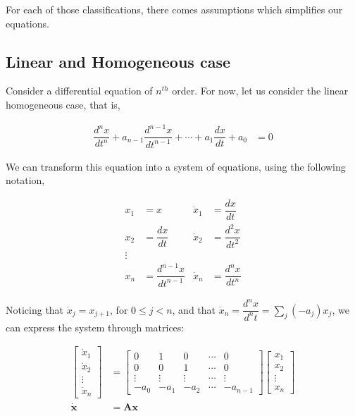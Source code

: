 \documentclass[12pt]{article}
\begin{document}
		For each of those classifications, there comes assumptions which simplifies our equations.
	
	\subsection{Linear and Homogeneous case}
	Consider a differential equation of $n^{th}$ order. For now, let us consider the linear homogeneous case, that is,
	
	\begin{align}
	\dfrac{d^{n}x}{dt^{n}} + a_{n-1}\dfrac{d^{n-1}x}{dt^{n-1}} + \cdots + a_{1}\dfrac{dx}{dt} + a_{0} &= 0
	\end{align}
	
	We can transform this equation into a system of equations, using the following notation,
	
	\begin{align}
	x_{1} &= x & \dot{x}_{1} &= \dfrac{dx}{dt}\\
	x_{2} &= \dfrac{dx}{dt} & \dot{x}_{2} &= \dfrac{d^{2}x}{dt^{2}}\\
	\vdots\\
	x_{n} &= \dfrac{d^{n-1}x}{dt^{n-1}} & \dot{x}_{n} &= \dfrac{d^{n}x}{dt^{n}}
	\end{align}
	
	Noticing that $\dot{x}_{j} = x_{j+1}$, for $0 \leq j < n$, and that $\dot{x}_{n} = \dfrac{d^{n}x}{d^{n}t} = \sum_{j}(-a_{j})x_{j}$, we can express the system through matrices:
	
	\begin{align}
	\begin{bmatrix}
	\dot{x}_{1}\\
	\dot{x}_{2}\\
	\vdots\\
	\dot{x}_{n}
	\end{bmatrix}
	&=
	\begin{bmatrix}
	0 & 1 & 0 & \cdots & 0\\
	0 & 0 & 1 & \cdots & 0\\
	\vdots & \vdots & \vdots & \cdots & \vdots\\
	-a_{0} & -a_{1} & -a_{2} & \cdots & -a_{n-1}
	\end{bmatrix}\begin{bmatrix}
	x_{1}\\
	x_{2}\\
	\vdots\\
	x_{n}
	\end{bmatrix}\\
	\dot{\mathbf{x}} &= \mathbf{Ax} \label{Equation 24}
	\end{align}
	
\end{document}
